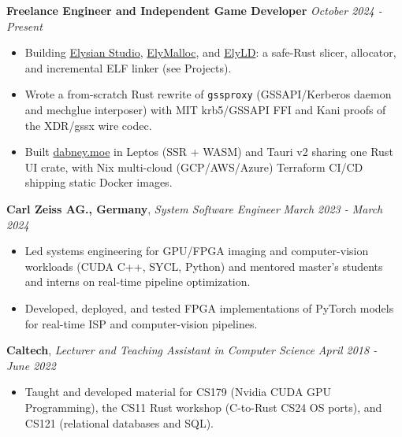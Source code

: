 \documentclass[8pt]{article}
\newenvironment{changemargin}[2]{%
  \begin{list}{}{%
    \setlength{\topsep}{0pt}%
    \setlength{\leftmargin}{#1}%
    \setlength{\rightmargin}{#2}%
    \setlength{\listparindent}{\parindent}%
    \setlength{\itemindent}{\parindent}%
    \setlength{\parsep}{0pt}%
    \setlength{\itemsep}{-2pt}%
  }%
  \item[]}{\end{list}
}
\newenvironment{body} {
	\vspace*{-10pt}
	\begin{changemargin}{-0.25in}{-0.5in}
  }	
	{\end{changemargin}
}
\begin{document}
\begin{body}
	\textbf{Freelance Engineer and Independent Game Developer} \hfill \emph{October 2024 - Present}\\
	\vspace*{-6pt}
	\begin{itemize} \itemsep -2pt
		\item Building \href{https://github.com/tyler274/elysian-studio}{Elysian Studio}, \href{https://github.com/tyler274/ElyMalloc}{ElyMalloc}, and \href{https://github.com/tyler274/ElyLD}{ElyLD}: a safe-Rust slicer, allocator, and incremental ELF linker (see Projects).
		\item Wrote a from-scratch Rust rewrite of \texttt{gssproxy} (GSSAPI/Kerberos daemon and mechglue interposer) with MIT krb5/GSSAPI FFI and Kani proofs of the XDR/gssx wire codec.
		\item Built \href{https://dabney.moe}{dabney.moe} in Leptos (SSR + WASM) and Tauri v2 sharing one Rust UI crate, with Nix multi-cloud (GCP/AWS/Azure) Terraform CI/CD shipping static Docker images.
	\end{itemize}
	\vspace*{-6pt}

	\textbf{Carl Zeiss AG., Germany}, \emph{System Software Engineer} \hfill \emph{March 2023 - March 2024}\\
	\vspace*{-6pt} %
	\begin{itemize} \itemsep -2pt %
		\item Led systems engineering for GPU/FPGA imaging and computer-vision workloads (CUDA C++, SYCL, Python) and mentored master's students and interns on real-time pipeline optimization.
		\item Developed, deployed, and tested FPGA implementations of PyTorch models for real-time ISP and computer-vision pipelines.
	\end{itemize}
	\vspace*{-6pt}

	\textbf{Caltech}, \emph{Lecturer and Teaching Assistant in Computer Science} \hfill \emph{April 2018 - June 2022}\\
	\vspace*{-6pt}
	\begin{itemize} \itemsep -2pt
		\item Taught and developed material for CS179 (Nvidia CUDA GPU Programming), the CS11 Rust workshop (C-to-Rust CS24 OS ports), and CS121 (relational databases and SQL).
	\end{itemize}
	\vspace*{-6pt}


\end{body}
\end{document}
